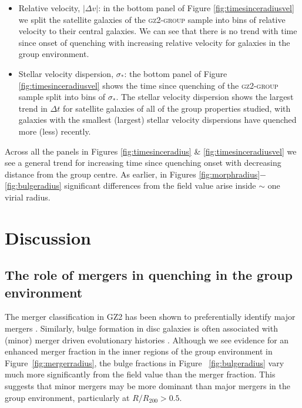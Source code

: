 \documentclass[useAMS,usenatbib]{mn2e}
\begin{document}
\begin{itemize}
\item{Relative velocity, $|\Delta v|$: in the bottom panel of Figure \ref{fig:timesinceradiusvel} we split the satellite galaxies of the \textsc{gz2-group} sample into bins of relative velocity to their central galaxies. We can see that there is no trend with time since onset of quenching with increasing relative velocity for galaxies in the group environment.}

\item{Stellar velocity dispersion, $\sigma_*$: the bottom panel of Figure \ref{fig:timesinceradiusvel} shows the time since quenching of the \textsc{gz2-group} sample split into bins of $\sigma_*$. The stellar velocity dispersion shows the largest trend in $\Delta t$ for satellite galaxies of all of the group properties studied, with galaxies with the smallest (largest) stellar velocity dispersions have quenched more (less) recently. }
\end{itemize}

Across all the panels in Figures \ref{fig:timesinceradius} \& \ref{fig:timesinceradiusvel} we see a general trend for increasing time since quenching onset with decreasing distance from the group centre. As earlier, in Figures \ref{fig:morphradius}$-$\ref{fig:bulgeradius} significant differences from the field value arise inside $\sim$ one virial radius. 


\section{Discussion}\label{sec:disc}

\subsection{The role of mergers in quenching in the group environment}\label{sec:rolemergerenv}

The merger classification in GZ2 has been shown to preferentially identify major mergers \citep{darg10a}. Similarly, bulge formation in disc galaxies is often associated with (minor) merger driven evolutionary histories \citep{croton06, tonini16}.  Although we see evidence for an enhanced merger fraction in the inner regions of the group environment in Figure~\ref{fig:mergerradius}, the bulge fractions in Figure ~\ref{fig:bulgeradius} vary much more significantly from the field value than the merger fraction. This suggests that minor mergers may be more dominant than major mergers in the group environment, particularly at $R/R_{200} > 0.5$. 
\end{document}
